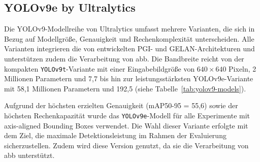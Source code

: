 \subsection{YOLOv9e by Ultralytics}
\label{subsec:yolov9e}

Die \acrshort{YOLO}v9-Modellreihe von Ultralytics umfasst mehrere Varianten, die sich in Bezug auf Modellgröße, Genauigkeit und Rechenkomplexität unterscheiden. Alle Varianten integrieren die von \citeauthor{wang2024_sapkota} entwickelten \acrshort{PGI}- und \acrshort{GELAN}-Architekturen und unterstützen zudem die Verarbeitung von \acrshort{abb}. Die Bandbreite reicht von der kompakten \texttt{YOLOv9t}-Variante mit einer Eingabebildgröße von $640 \times 640$ Pixeln, 2 Millionen Parametern und 7{,}7  bis hin zur leistungsstärksten \acrshort{YOLO}v9e-Variante mit 58{,}1 Millionen Parametern und 192{,}5  (siehe Tabelle~\ref{tab:yolov9-models}).  

Aufgrund der höchsten erzielten Genauigkeit (\acrshort{mAP}50-95 = 55,6) sowie der höchsten Rechenkapazität wurde das \texttt{YOLOv9e}-Modell für alle Experimente mit axis-aligned Bounding Boxes verwendet. Die Wahl dieser Variante erfolgte mit dem Ziel, die maximale Detektionsleistung im Rahmen der Evaluierung sicherzustellen. Zudem wird diese Version genutzt, da sie die Verarbeitung von \acrlong{abb} unterstützt.



